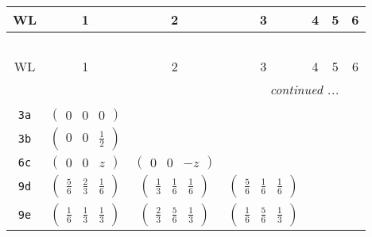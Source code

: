 \documentclass[fleqn,9pt,landscape]{jsarticle}
\begin{document}
\begin{center}
\renewcommand{\arraystretch}{1.2}
\begin{longtable}{ccccccc}
 \hline \hline
WL & 1 & 2 & 3 & 4 & 5 & 6 \\ \hline \endfirsthead

\multicolumn{6}{l}{\tablename\ \thetable{}} \\
 \hline \hline
WL & 1 & 2 & 3 & 4 & 5 & 6 \\ \hline \endhead

 \hline \hline
\multicolumn{6}{r}{\footnotesize\it continued ...} \\ \endfoot

 \hline \hline
\multicolumn{6}{r}{} \\ \endlastfoot

{\tt 3a} & $ \begin{pmatrix} 0 & 0 & 0 \end{pmatrix} $ & $  $ & $  $ & $  $ & $  $ & $  $ \\ \hline
{\tt 3b} & $ \begin{pmatrix} 0 & 0 & \frac{1}{2} \end{pmatrix} $ & $  $ & $  $ & $  $ & $  $ & $  $ \\ \hline
{\tt 6c} & $ \begin{pmatrix} 0 & 0 & z \end{pmatrix} $ & $ \begin{pmatrix} 0 & 0 & - z \end{pmatrix} $ & $  $ & $  $ & $  $ & $  $ \\ \hline
{\tt 9d} & $ \begin{pmatrix} \frac{5}{6} & \frac{2}{3} & \frac{1}{6} \end{pmatrix} $ & $ \begin{pmatrix} \frac{1}{3} & \frac{1}{6} & \frac{1}{6} \end{pmatrix} $ & $ \begin{pmatrix} \frac{5}{6} & \frac{1}{6} & \frac{1}{6} \end{pmatrix} $ & $  $ & $  $ & $  $ \\ \hline
{\tt 9e} & $ \begin{pmatrix} \frac{1}{6} & \frac{1}{3} & \frac{1}{3} \end{pmatrix} $ & $ \begin{pmatrix} \frac{2}{3} & \frac{5}{6} & \frac{1}{3} \end{pmatrix} $ & $ \begin{pmatrix} \frac{1}{6} & \frac{5}{6} & \frac{1}{3} \end{pmatrix} $ & $  $ & $  $ & $  $ \\ \hline

\end{longtable}
\end{center}
\end{document}
